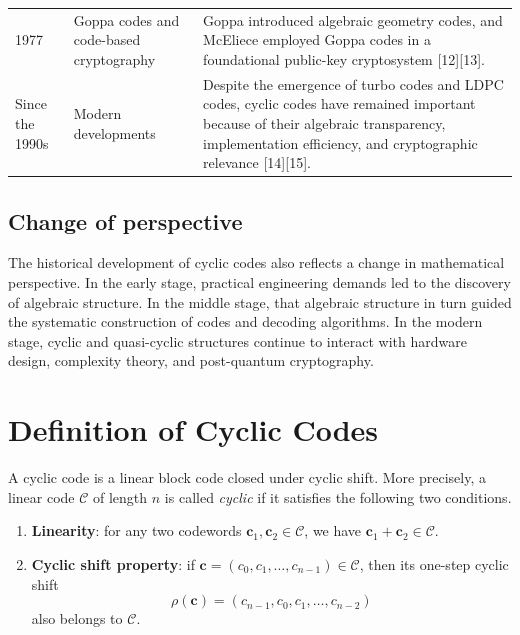 \documentclass[11pt,oneside]{book}
\providecommand{\tightlist}{\setlength{\itemsep}{0pt}\setlength{\parskip}{0pt}}
\theoremstyle{plain}
\theoremstyle{definition}
\theoremstyle{remark}
\begin{document}
\begin{longtable}{@{}p{1.8cm}p{4.2cm}>{\raggedright\arraybackslash}p{8.0cm}@{}}
1977
& Goppa codes and code-based cryptography
& Goppa introduced algebraic geometry codes, and McEliece employed Goppa codes in a foundational public-key cryptosystem {[}12{]}{[}13{]}. \\

Since the 1990s
& Modern developments
& Despite the emergence of turbo codes and LDPC codes, cyclic codes have remained important because of their algebraic transparency, implementation efficiency, and cryptographic relevance {[}14{]}{[}15{]}. \\

\end{longtable}

\subsection{Change of perspective}\label{sec:change-of-perspective}

The historical development of cyclic codes also reflects a change in mathematical perspective. In the early stage, practical engineering demands led to the discovery of algebraic structure. In the middle stage, that algebraic structure in turn guided the systematic construction of codes and decoding algorithms. In the modern stage, cyclic and quasi-cyclic structures continue to interact with hardware design, complexity theory, and post-quantum cryptography. 

\section{Definition of Cyclic Codes}\label{sec:definition-of-cyclic-codes}

A cyclic code is a linear block code closed under cyclic shift. More precisely, a linear code \(\mathcal{C}\) of length \(n\) is called \emph{cyclic} if it satisfies the following two conditions.

\begin{enumerate}
\def\labelenumi{\arabic{enumi}.}
\tightlist
\item
  \textbf{Linearity}: for any two codewords
  \(\mathbf{c}_1, \mathbf{c}_2 \in \mathcal{C}\), we have
  \(\mathbf{c}_1 + \mathbf{c}_2 \in \mathcal{C}\).
\item
  \textbf{Cyclic shift property}: if \(\mathbf{c}=(c_0,c_1,\dots,c_{n-1})\in\mathcal{C}\), then its one-step cyclic shift
  \[\rho(\mathbf{c})=(c_{n-1},c_0,c_1,\dots,c_{n-2})\]
  also belongs to \(\mathcal{C}\).
\end{enumerate}
\end{document}
